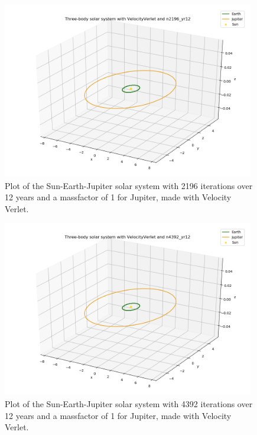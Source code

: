 \documentclass{article}
\begin{document}
    \begin{figure}[H]
        \centering
        \includegraphics[width = 11cm]{img/plot3D_S_E_J_V_n2196_yr12.png}
        \caption{Plot of the Sun-Earth-Jupiter solar system with 2196 iterations over 12 years and a massfactor of 1 for Jupiter, made with Velocity Verlet.}
        \label{fig:plot3D_S_E_J_V_n2196_yr12}
    \end{figure}

    \begin{figure}[H]
        \centering
        \includegraphics[width = 11cm]{img/plot3D_S_E_J_V_n4392_yr12.png}
        \caption{Plot of the Sun-Earth-Jupiter solar system with 4392 iterations over 12 years and a massfactor of 1 for Jupiter, made with Velocity Verlet.}
        \label{fig:plot3D_S_E_J_V_n4392_yr12}
    \end{figure}
\end{document}
